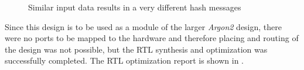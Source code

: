 \documentclass[%
	a4paper,
]
{article}
\begin{document}
\begin{figure}[!ht]
	\centering
	\caption{Similar input data results in a very different hash messages}
	\label{2messagehash}
\end{figure}

Since this design is to be used as a module of the larger \emph{Argon2} design, there were no ports to be mapped to the hardware and therefore placing and routing of the design was not possible, but the RTL synthesis and optimization was successfully completed. The RTL optimization report is shown in  .
\end{document}
